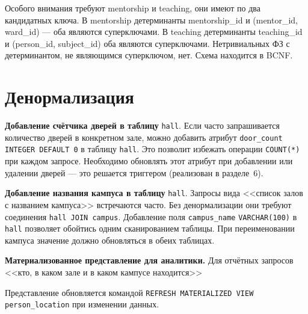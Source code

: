 \documentclass[12pt,a4paper]{article}
\begin{document}
Особого внимания требуют mentorship и teaching, они имеют по два кандидатных ключа. В mentorship детерминанты mentorship_id и (mentor_id, ward_id) — оба являются суперключами. В teaching детерминанты teaching_id и (person_id, subject_id)  оба являются суперключами. Нетривиальных ФЗ с детерминантом, не являющимся суперключом, нет. Схема находится в BCNF.
\section{Денормализация}

\noindent\textbf{Добавление счётчика дверей в таблицу} \texttt{hall}.
Если часто запрашивается количество дверей в конкретном зале, можно добавить
атрибут \texttt{door\_count INTEGER DEFAULT~0} в таблицу \texttt{hall}.
Это позволит избежать операции \texttt{COUNT(*)} при каждом запросе.
Необходимо обновлять этот атрибут при добавлении или удалении дверей ---
это решается триггером (реализован в разделе~6).

\vspace{5pt}
\noindent\textbf{Добавление названия кампуса в таблицу} \texttt{hall}.
Запросы вида <<список залов с названием кампуса>> встречаются часто.
Без денормализации они требуют соединения \texttt{hall\,JOIN\,campus}.
Добавление поля \texttt{campus\_name} \texttt{VARCHAR(100)} в \texttt{hall}
позволяет обойтись одним сканированием таблицы. При переименовании
кампуса значение должно обновляться в обеих таблицах.

\vspace{5pt}
\noindent\textbf{Материализованное представление для аналитики.}
Для отчётных запросов <<кто, в каком зале и в каком кампусе находится>>


Представление обновляется командой
\texttt{REFRESH MATERIALIZED VIEW person\_location} при изменении данных.
\end{document}
